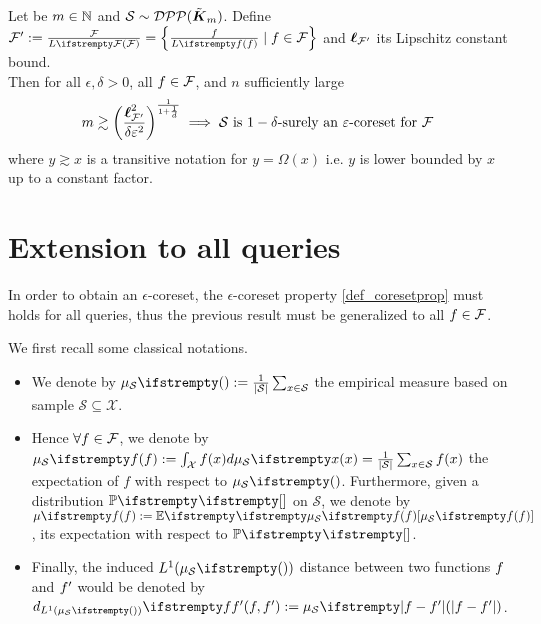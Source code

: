 \begin{tcolorbox}[title=Breuer]
	\begin{theorem}
		\label{thm_fixedtheta}
		Let be $m\in \mathbb{N}$ and $\mathcal{S} \sim  \mathcal{DPP}(\tilde{\boldsymbol K}_{m})$. 
		Define $\queryset':=\frac{\queryset}{\loss{\queryset}}=\left\{\frac{\query}{\loss{\query}}\mid \query \in \queryset\right\}$ and $\boldsymbol\ell_{\mathcal{F}'}$ its Lipschitz constant bound.\\

		Then for all $\epsilon, \delta >0$, all $f \in \mathcal{F}$, and $n$ sufficiently large
		\begin{equation}
			m \gtrsim \left(\frac{\boldsymbol\ell^2_{\mathcal{F}'}}{\delta\varepsilon^2} \right)^{\frac{1}{1+\frac 1 d}} \implies \text{$\mathcal{S}$ is $1-\delta$-surely an $\varepsilon$-coreset for $\mathcal{F}$ }
		\end{equation}
		where $y \gtrsim x$ is a transitive notation for $y = \Omega(x)$ i.e. $y$ is lower bounded by $x$ up to a constant factor.
	\end{theorem}
\end{tcolorbox}



\section{Extension to all queries}
In order to obtain an $\epsilon$-coreset, the $\epsilon$-coreset property \ref{def_coresetprop} must holds for all queries, thus the previous result must be generalized to all $f \in \mathcal{F}$.

We first recall some classical notations.
\begin{itemize}
	\item We denote by $\empdistr{\mathcal{S}}{}:=\frac{1}{|\mathcal{S}|} \sum_{x \in \mathcal{S}}$ the empirical measure based on sample $\mathcal{S}  \subseteq \mathcal{X}$. 
	\item Hence $\forall f \in \mathcal{F}$, we denote by $\empdistr{\mathcal{S}}{\query}:=\int_{\mathcal{X}} \query(x) d\empdistr{\mathcal{S}}{x} = \frac{1}{|\mathcal{S}|} \sum_{x \in \mathcal{S}} \query(x)$ the expectation of $f$ with respect to $\empdistr{\mathcal{S}}{}$. Furthermore, given a distribution $\PP{}{}$ on $\mathcal{S}$, we denote by $\meanempdistr{f}:=\EE{}{\empdistr{\mathcal{S}}{\query}}$, its expectation with respect to $\PP{}{}$. 
	\item Finally, the induced $L^1(\empdistr{\mathcal{S}}{})$ distance between two functions $f$ and $f'$ would be denoted by $\dlone{\empdistr{\mathcal{S}}{}}{\query}{\query'}:=\empdistr{\mathcal{S}}{|\query - \query'|}$.
\end{itemize}  


